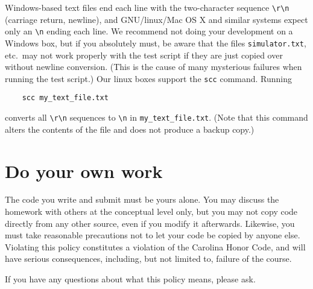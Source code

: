 Windows-based text files end each line with the two-character
sequence \verb+\r\n+ (carriage return, newline), and GNU/linux/Mac OS X and
similar systems expect only an \verb+\n+ ending each line.
We recommend not doing your development on a Windows box, but if you
absolutely must, be aware that the files \texttt{simulator.txt}, etc.\ may
not work properly with the test script if they are just copied over
without newline conversion.
(This is the cause of many mysterious failures when running the test script.)
Our linux boxes support the \texttt{scc} command.  Running
\begin{verbatim}
    scc my_text_file.txt
\end{verbatim}
converts all \verb+\r\n+ sequences to \verb+\n+ in \texttt{my\_text\_file.txt}.
(Note that this command alters the contents of the file and does not
produce a backup copy.)

\section*{Do your own work}

The code you write and submit must be yours alone.
You may discuss the homework with others at the conceptual level only,
but you may not copy code directly from any other source, even if you
modify it afterwards.
Likewise, you must take reasonable precautions not to let your code be
copied by anyone else.
Violating this policy constitutes a violation of the Carolina Honor Code,
and will have serious consequences, including, but not limited to,
failure of the course.

If you have any questions about what this policy means, please ask.

%
